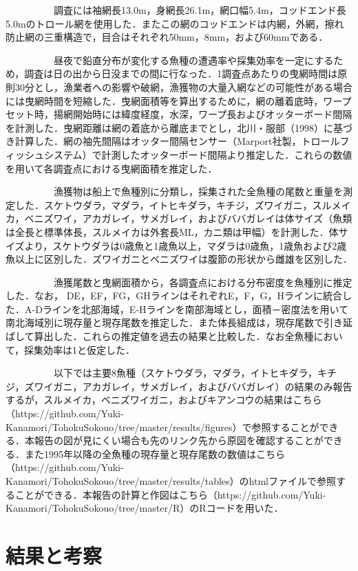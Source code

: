 \documentclass[11pt]{article} %
\begin{document}
\begin{linenumbers}
\ \ \ \ \ \ \ \ \ \ 
調査には袖網長13.0m，身網長26.1m，網口幅5.4m，コッドエンド長5.0mのトロール網を使用した．またこの網のコッドエンドは内網，外網，擦れ防止網の三重構造で，目合はそれぞれ50mm，8mm，および60mmである．

\ \ \ \ \ \ \ \ \ \ 
昼夜で鉛直分布が変化する魚種の遭遇率や採集効率を一定にするため，調査は日の出から日没までの間に行なった．1調査点あたりの曳網時間は原則30分とし，漁業者への影響や破網，漁獲物の大量入網などの可能性がある場合には曳網時間を短縮した．曳網面積等を算出するために，網の離着底時，ワープセット時，揚網開始時には緯度経度，水深，ワープ長およびオッターボード間隔を計測した．曳網距離は網の着底から離底までとし，北川・服部（1998）に基づき計算した．網の袖先間隔はオッター間隔センサー（Marport社製，トロールフィッシュシステム）で計測したオッターボード間隔より推定した．これらの数値を用いて各調査点における曳網面積を推定した．

\ \ \ \ \ \ \ \ \ \ 
漁獲物は船上で魚種別に分類し，採集された全魚種の尾数と重量を測定した．スケトウダラ，マダラ，イトヒキダラ，キチジ，ズワイガニ，スルメイカ，ベニズワイ，アカガレイ，サメガレイ，およびババガレイは体サイズ（魚類は全長と標準体長，スルメイカは外套長ML，カニ類は甲幅）を計測した．体サイズより，スケトウダラは0歳魚と1歳魚以上，マダラは0歳魚，1歳魚および2歳魚以上に区別した．ズワイガニとベニズワイは腹節の形状から雌雄を区別した．

\ \ \ \ \ \ \ \ \ \ 
漁獲尾数と曳網面積から，各調査点における分布密度を魚種別に推定した．なお， DE，EF，FG，GHラインはそれぞれE，F，G，Hラインに統合した．A-Dラインを北部海域，E-Hラインを南部海域とし，面積－密度法を用いて南北海域別に現存量と現存尾数を推定した．また体長組成は，現存尾数で引き延ばして算出した．これらの推定値を過去の結果と比較した．なお全魚種において，採集効率は1と仮定した．

\ \ \ \ \ \ \ \ \ \ 
以下では主要8魚種（スケトウダラ，マダラ，イトヒキダラ，キチジ，ズワイガニ，アカガレイ，サメガレイ，およびババガレイ）の結果のみ報告するが，スルメイカ，ベニズワイガニ，およびキアンコウの結果はこちら（https://github.com/Yuki-Kanamori/TohokuSokouo/tree/master/results/figures）で参照することができる．本報告の図が見にくい場合も先のリンク先から原図を確認することができる．また1995年以降の全魚種の現存量と現存尾数の数値はこちら（https://github.com/Yuki-Kanamori/TohokuSokouo/tree/master/results/tables）のhtmlファイルで参照することができる．本報告の計算と作図はこちら（https://github.com/Yuki-Kanamori/TohokuSokouo/tree/master/R）のRコードを用いた．

\section{結果と考察}

\end{linenumbers}
\end{document}
